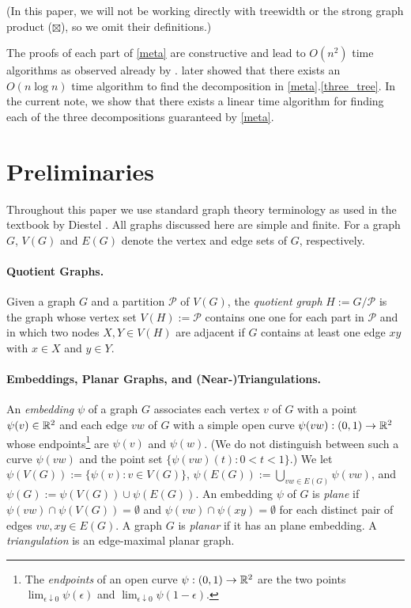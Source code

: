 \documentclass{patmorin}
\begin{document}
(In this paper, we will not be working directly with treewidth or the strong graph product ($\boxtimes$), so we omit their definitions.)

The proofs of each part of \cref{meta} are constructive and lead to $O(n^2)$ time algorithms as observed already by \citet{dujmovic.joret.ea:planar}.  \citet{morin:fast} later showed that there exists an $O(n\log n)$ time algorithm to find the decomposition in \cref{meta}.\ref{three_tree}.  In the current note, we show that there exists a linear time algorithm for finding each of the three decompositions guaranteed by \cref{meta}.


\section{Preliminaries}

Throughout this paper we use standard graph theory terminology as used in the textbook by Diestel \cite{diestel:graph}.  All graphs discussed here are simple and finite.  For a graph $G$, $V(G)$ and $E(G)$ denote the vertex and edge sets of $G$, respectively.

\paragraph{Quotient Graphs.}

Given a graph $G$ and a partition $\mathcal{P}$ of $V(G)$, the \emph{quotient graph} $H:=G/\mathcal{P}$ is the graph whose vertex set $V(H):=\mathcal{P}$ contains one one for each part in $\mathcal{P}$ and in which two nodes $X,Y\in V(H)$ are adjacent if $G$ contains at least one edge $xy$ with $x\in X$ and $y\in Y$.

\paragraph{Embeddings, Planar Graphs, and (Near-)Triangulations.}

An \emph{embedding} $\psi$ of a graph $G$ associates each vertex $v$ of $G$ with a point $\psi(v)\in \mathbb{R}^2$ and each edge $vw$ of $G$ with a simple open curve $\psi(vw):(0,1)\to\mathbb{R}^2$ whose endpoints\footnote{The \emph{endpoints} of an open curve $\psi:(0,1)\to\mathbb{R}^2$ are the two points $\lim_{\epsilon\downarrow 0} \psi(\epsilon)$ and $\lim_{\epsilon\downarrow 0}\psi(1-\epsilon)$.} are $\psi(v)$ and $\psi(w)$.  (We do not distinguish between such a curve $\psi(vw)$ and the point set $\{\psi(vw)(t):0<t<1\}$.)
We let $\psi(V(G)):=\{\psi(v):v\in V(G)\}$, $\psi(E(G)):=\bigcup_{vw\in E(G)} \psi(vw)$, and $\psi(G):=\psi(V(G))\cup\psi(E(G))$.  An embedding $\psi$ of $G$ is \emph{plane} if $\psi(vw)\cap\psi(V(G))=\emptyset$ and $\psi(vw)\cap\psi(xy)=\emptyset$ for each distinct pair of edges $vw,xy\in E(G)$.  A graph $G$ is \emph{planar} if it has an plane embedding. A \emph{triangulation} is an edge-maximal planar graph.
\end{document}
